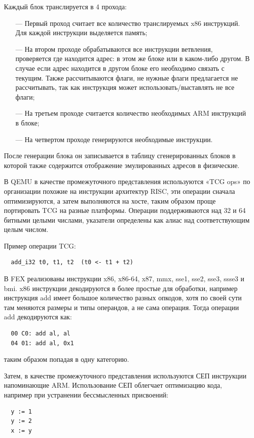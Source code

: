 Каждый блок транслируется в 4 прохода:
\begin{itemize}[leftmargin=1.6\parindent]
	\item[---] Первый проход считает все количество транслируемых x86 инструкций. Для каждой инструкции выделяется память;
	\item[---] На втором проходе обрабатываются все инструкции ветвления, проверяется где находится адрес: в этом же блоке или в каком-либо другом. В случае если адрес находится в другом блоке его необходимо связать с текущим. Также рассчитываются флаги, не нужные флаги предлагается не рассчитывать, так как инструкция может использовать/выставлять не все флаги;
	\item[---] На третьем проходе считается количество необходимых ARM инструкций в блоке;
	\item[---] На четвертом проходе генерируются необходимые инструкции.
\end{itemize}

После генерации блока он записывается в таблицу сгенерированных блоков в которой также содержится отображение эмулированных адресов в физические. \cite{box64_wide}

В QEMU в качестве промежуточного представления используются «TCG ops» по организации похожие на инструкции архитектур RISC, эти операции сначала оптимизируются, а затем выполняются на хосте, таким образом проще портировать TCG на разные платформы. Операции поддерживаются над 32 и 64 битными целыми числами, указатели определены как алиас над соответствующим целым числом. \cite{qemu_readme}

Пример операции TCG:
\begin{Verbatim}
  add_i32 t0, t1, t2  (t0 <- t1 + t2)
\end{Verbatim}

В FEX реализованы инструкции x86, x86-64, x87, mmx, sse1, sse2, sse3, ssse3 и bmi. x86 инструкции декодируются в более простые для обработки, например инструкция add имеет большое количество разных опкодов, хотя по своей сути там меняются размеры и типы операндов, а не сама операция. Тогда операции add декодируются как:
\begin{Verbatim}
  00 C0: add al, al
  04 01: add al, 0x1
\end{Verbatim}
таким образом попадая в одну категорию.

Затем, в качестве промежуточного представления используются СЕП инструкции напоминающие ARM. Использование СЕП облегчает оптимизацию кода, например при устранении бессмысленных присвоений:
\begin{Verbatim}
  y := 1
  y := 2
  x := y
\end{Verbatim}

